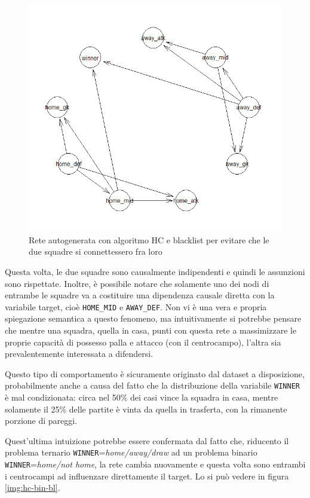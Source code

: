\documentclass[hidelinks, 12pt]{article}
\begin{document}
\begin{figure}[H]
	\centering
	\includegraphics[scale=0.7]{images/05_02_hc_bl.png}
	\caption[Rete autogenerata con algoritmo HC e blacklist per evitare che le due squadre si connettessero fra loro]{Rete autogenerata con algoritmo HC e blacklist per evitare che le due squadre si connettessero fra loro}
	\label{img:hc-bl}
\end{figure}

Questa volta, le due squadre sono causalmente indipendenti e quindi le assunzioni sono rispettate. Inoltre, è possibile notare che solamente uno dei nodi di entrambe le squadre va a costituire una dipendenza causale diretta con la variabile target, cioè \texttt{HOME\_MID} e \texttt{AWAY\_DEF}. Non vi è una vera e propria spiegazione semantica a questo fenomeno, ma intuitivamente si potrebbe pensare che mentre una squadra, quella in casa, punti con questa rete a massimizzare le proprie capacità di possesso palla e attacco (con il centrocampo), l'altra sia prevalentemente interessata a difendersi.

Questo tipo di comportamento è sicuramente originato dal dataset a disposizione, probabilmente anche a causa del fatto che la distribuzione della variabile \texttt{WINNER} è mal condizionata: circa nel 50\% dei casi vince la squadra in casa, mentre solamente il 25\% delle partite è vinta da quella in trasferta, con la rimanente porzione di pareggi.

Quest'ultima intuizione potrebbe essere confermata dal fatto che, riducento il problema ternario \texttt{WINNER}=\textit{home/away/draw} ad un problema binario \texttt{WINNER}=\textit{home/not home}, la rete cambia nuovamente e questa volta sono entrambi i centrocampi ad influenzare direttamente il target. Lo si può vedere in figura \ref{img:hc-bin-bl}.
\end{document}
